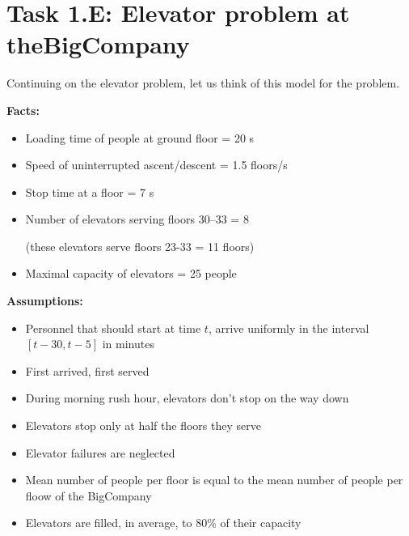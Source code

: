 \section*{Task 1.E: Elevator problem at theBigCompany}


Continuing on the elevator problem, let us think of this model for the problem.

\textbf{Facts:}
\begin{itemize}
	\item Loading time of people at ground floor = 20 s
	\item Speed of uninterrupted ascent/descent = 1.5 floors/s
	\item Stop time at a floor = 7 s
	\item Number of elevators serving floors 30--33 = 8

	(these elevators serve floors 23-33 = 11 floors)
	
	\item Maximal capacity of elevators = 25 people
\end{itemize}


\textbf{Assumptions:}
\begin{itemize}
	\item Personnel that should start at time $t$, arrive uniformly in the interval $[t-30, t-5]$ in minutes
	\item First arrived, first served
	\item During morning rush hour, elevators don't stop on the way down
	\item Elevators stop only at half the floors they serve
	\item Elevator failures are neglected
	\item Mean number of people per floor is equal to the mean number of people per floow of the BigCompany
	\item Elevators are filled, in average, to 80\% of their capacity
\end{itemize}


